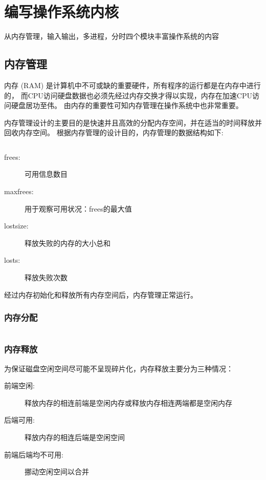 \chapter{编写操作系统内核}

从内存管理，输入输出，多进程，分时四个模块丰富操作系统的内容

\section{内存管理}

内存 (RAM) 是计算机中不可或缺的重要硬件，所有程序的运行都是在内存中进行的，
而CPU访问硬盘数据也必须先经过内存交换才得以实现，内存在加速CPU访问硬盘居功至伟。
由内存的重要性可知内存管理在操作系统中也非常重要。	

内存管理设计的主要目的是快速并且高效的分配内存空间，并在适当的时间释放并回收内存空间。
根据内存管理的设计目的，内存管理的数据结构如下:

\inputminted[tabsize=2, firstline=137, lastline=143,
linenos=true]{c}{../ZOS/src/kernel/bootpack.h}

\begin{description}
\item[frees:]可用信息数目
\item[maxfrees:]用于观察可用状况：frees的最大值
\item[lostsize:]释放失败的内存的大小总和
\item[losts:]释放失败次数
\end{description}

经过内存初始化和释放所有内存空间后，内存管理正常运行。

\subsection{内存分配}

\begin{listing}[H]
  \inputminted[tabsize=2, firstline=68, lastline=80,
  linenos=true]{c}{../ZOS/src/kernel/memory.c}
\end{listing}

\subsection{内存释放}

为保证磁盘空闲空间尽可能不呈现碎片化，内存释放主要分为三种情况：

\begin{description}
\item[前端空闲:]释放内存的相连前端是空闲内存或释放内存相连两端都是空闲内存
\item[后端可用:]释放内存的相连后端是空闲空间
\item[前端后端均不可用:]挪动空闲空间以合并
\end{description}

